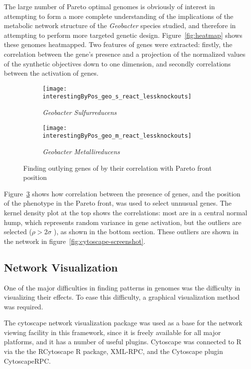 \documentclass[a4paper,twocolumn]{article}
\begin{document}
The large number of Pareto optimal genomes is obviously of interest in attempting to form a more complete understanding of the implications of the metabolic network structure of the {\it Geobacter} species studied, and therefore in attempting to perform more targeted genetic design. Figure~\ref{fig:heatmap} shows these genomes heatmapped. Two features of genes were extracted: firstly, the correlation between the gene’s presence and a projection of the normalized values of the synthetic objectives down to one dimension, and secondly correlations between the activation of genes. 

\begin{figure}[!htb]
	\begin{subfigure}[htb]{0.5\textwidth}
                \texttt{[image: interestingByPos\_geo\_s\_react\_lessknockouts]}
                \caption{\it Geobacter Sulfurreducens}
                \label{fig:outlyinggenes:sul}
	\end{subfigure}
	\begin{subfigure}[htb]{0.5\textwidth}
                \texttt{[image: interestingByPos\_geo\_m\_react\_lessknockouts]}
                \caption{\it Geobacter Metallireducens}
                \label{fig:outlyinggenes:met}
	\end{subfigure}
	\caption{Finding outlying genes of by their correlation with Pareto front position}
	\label{fig:outlyinggenes}
\end{figure}

Figure~\ref{fig:outlyinggenes} shows how correlation between the presence of genes, and the position of the phenotype in the Pareto front, was used to select unnusual genes. The kernel density plot at the top shows the correlations: most are in a central normal hump, which represents random variance in gene activation, but the outliers are selected (\( \rho > 2\sigma \) ), as shown in the bottom section. These outliers are shown in the network in figure~\ref{fig:cytoscape-screenshot}.

\subsection{Network Visualization}
One of the major difficulties in finding patterns in genomes was the difficulty in visualizing their effects. To ease this difficulty, a graphical visualization method was required.

The cytoscape network visualization package was used as a base for the network viewing facility in this framework, since it is freely available for all major platforms, and it has a number of useful plugins. Cytoscape was connected to R via the the RCytoscape R package, XML-RPC, and the Cytoscape plugin CytoscapeRPC.
\end{document}
